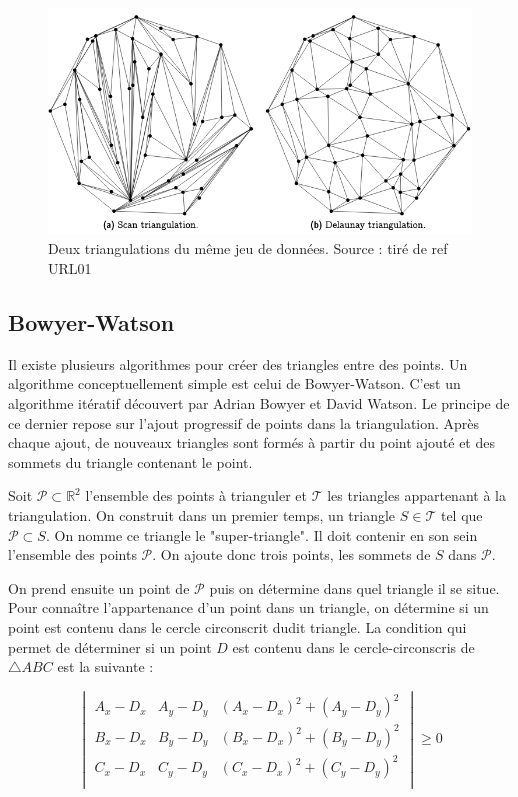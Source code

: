 \begin{figure}[htb!]
    \centering
    \includegraphics[width=0.8\linewidth]{figures/triangulation-example.png}
    \caption{Deux triangulations du même jeu de données. Source : tiré de ref URL01}
    \label{fig:triangulation_example}
\end{figure}

\subsection{Bowyer-Watson}
Il existe plusieurs algorithmes pour créer des triangles entre des points.
Un algorithme conceptuellement simple est celui de Bowyer-Watson.
C'est un algorithme itératif découvert par Adrian Bowyer et David Watson.
Le principe de ce dernier repose sur l’ajout progressif de points dans la triangulation.
Après chaque ajout, de nouveaux triangles sont formés à partir du point ajouté et des sommets du triangle contenant le point.

Soit $\mathcal{P} \subset \mathbb{R}^2$ l'ensemble des points à trianguler et $\mathcal{T}$ les triangles appartenant à la triangulation. On construit dans un premier temps, un triangle $S \in \mathcal{T}$ tel que $\mathcal{P} \subset S$. On nomme ce triangle le "super-triangle". Il doit contenir en son sein l'ensemble des points $\mathcal{P}$. On ajoute donc trois points, les sommets de $S$ dans $\mathcal{P}$.

On prend ensuite un point de $\mathcal{P}$ puis on détermine dans quel triangle il se situe.
Pour connaître l'appartenance d'un point dans un triangle, on détermine si un point est contenu dans le cercle circonscrit dudit triangle.
La condition qui permet de déterminer si un point $D$ est contenu dans le cercle-circonscris de $\triangle ABC$ est la suivante :

$$
\begin{vmatrix}
 A_x - D_x & A_y - D_y & (A_x - D_x)^2 + (A_y - D_y)^2 \\
 B_x - D_x & B_y - D_y & (B_x - D_x)^2 + (B_y - D_y)^2 \\
 C_x - D_x & C_y - D_y & (C_x - D_x)^2 + (C_y - D_y)^2 \\
\end{vmatrix} \geqslant 0
$$

